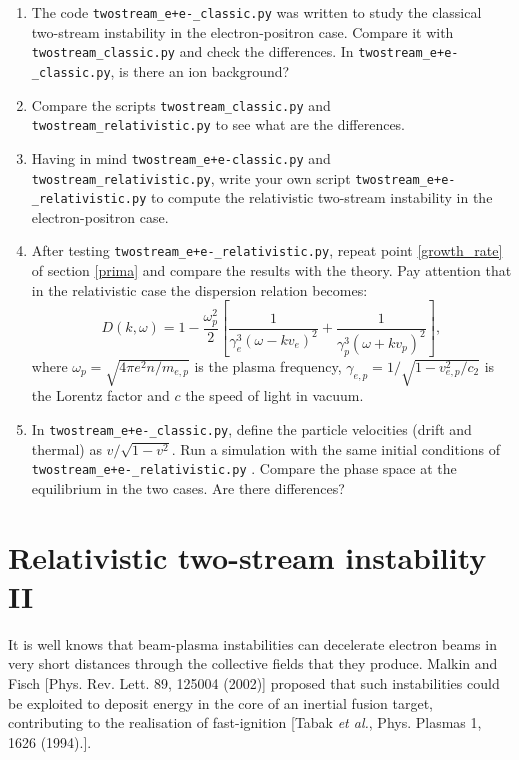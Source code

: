 \documentclass[]{exam}
\begin{document}
\begin{enumerate}

\item The code \texttt{twostream_e+e-_classic.py} was written to study the classical two-stream instability in the electron-positron case. Compare it with \texttt{twostream_classic.py} and check the differences. In \texttt{twostream_e+e-_classic.py}, is there an ion background?

\item Compare the scripts \texttt{twostream_classic.py} and \texttt{twostream_relativistic.py} to see what are the differences. 

\item Having in mind \texttt{twostream_e+e-classic.py} and \texttt{twostream_relativistic.py}, write your own script \texttt{twostream_e+e-_relativistic.py} to compute the relativistic two-stream instability in the electron-positron case.

\item After testing \texttt{twostream_e+e-_relativistic.py}, repeat point \ref{growth_rate} of section \ref{prima} and compare the results with the theory. Pay attention that in the relativistic case the dispersion relation becomes:
\begin{equation}
D(k,\omega) = 1-\frac{\omega_{p}^2}{2}\left[\frac{1}{\gamma_e^3(\omega-kv_e)^2}+\frac{1}{\gamma_p^3(\omega+kv_p)^2}\right],
\end{equation}
where $\omega_p=\sqrt{4\pi e^2 n/m_{e,p}}$ is the plasma frequency, $\gamma_{e,p} = 1/\sqrt{1-v_{e,p}^2/c_2}$ is the Lorentz factor and $c$ the speed of light in vacuum.

\item In \texttt{twostream_e+e-_classic.py}, define the particle velocities (drift and thermal) as $v/\sqrt{1-v^2}$. Run a simulation with the same initial conditions of \texttt{twostream_e+e-_relativistic.py} . Compare the phase space at the equilibrium in the two cases. Are there differences?

\end{enumerate}


\section{Relativistic two-stream instability II}

It is well knows that beam-plasma instabilities can decelerate electron beams in very short distances through the collective fields that they produce. Malkin and Fisch [Phys. Rev. Lett. 89, 125004 (2002)] proposed that such instabilities could be exploited to deposit energy in the core of an inertial fusion target, contributing to the realisation of fast-ignition [Tabak \textit{et al.}, Phys. Plasmas 1, 1626 (1994).].
\end{document}
